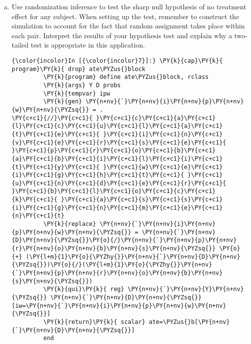 \documentclass[11pt,notitlepage]{article}\usepackage[]{graphicx}\usepackage[]{color}
\makeatletter
\newenvironment{kframe}{%
 \def\at@end@of@kframe{}%
 \ifinner\ifhmode%
  \def\at@end@of@kframe{\end{minipage}}%
  \begin{minipage}{\columnwidth}%
 \fi\fi%
 \def\FrameCommand##1{\hskip\@totalleftmargin \hskip-\fboxsep
 \colorbox{shadecolor}{##1}\hskip-\fboxsep
     \hskip-\linewidth \hskip-\@totalleftmargin \hskip\columnwidth}%
 \MakeFramed {\advance\hsize-\width
   \@totalleftmargin\z@ \linewidth\hsize
   \@setminipage}}%
 {\par\unskip\endMakeFramed%
 \at@end@of@kframe}
\newenvironment{knitrout}{}{} %
\makeatother
\begin{document}
\begin{enumerate}[a)]
\item Use randomization inference to test the sharp null hypothesis of no treatment effect for any subject.  When setting up the test, remember to construct the simulation to account for the fact that random assignment takes place within each pair.  Interpret the results of your hypothesis test and explain why a two-tailed test is appropriate in this application.
\begin{knitrout}
\color{fgcolor}\begin{kframe}
    \begin{Verbatim}[commandchars=\\\{\}]
{\color{incolor}In [{\color{incolor}7}]:} \PY{k}{cap}\PY{k}{ program}\PY{k}{ drop} ate\PYZus{}block	
         \PY{k}{program} define ate\PYZus{}block, rclass
         \PY{k}{args} Y D probs
         \PY{k}{tempvar} ipw
         \PY{k}{gen} \PY{n+nv}{`}\PY{n+nv}{i}\PY{n+nv}{p}\PY{n+nv}{w}\PY{n+nv}{\PYZsq{}} = .
\PY{c+c1}{//}\PY{c+c1}{ }\PY{c+c1}{c}\PY{c+c1}{a}\PY{c+c1}{l}\PY{c+c1}{c}\PY{c+c1}{u}\PY{c+c1}{l}\PY{c+c1}{a}\PY{c+c1}{t}\PY{c+c1}{e}\PY{c+c1}{ }\PY{c+c1}{i}\PY{c+c1}{n}\PY{c+c1}{v}\PY{c+c1}{e}\PY{c+c1}{r}\PY{c+c1}{s}\PY{c+c1}{e}\PY{c+c1}{ }\PY{c+c1}{p}\PY{c+c1}{r}\PY{c+c1}{o}\PY{c+c1}{b}\PY{c+c1}{a}\PY{c+c1}{b}\PY{c+c1}{i}\PY{c+c1}{l}\PY{c+c1}{i}\PY{c+c1}{t}\PY{c+c1}{y}\PY{c+c1}{ }\PY{c+c1}{w}\PY{c+c1}{e}\PY{c+c1}{i}\PY{c+c1}{g}\PY{c+c1}{h}\PY{c+c1}{t}\PY{c+c1}{ }\PY{c+c1}{u}\PY{c+c1}{n}\PY{c+c1}{d}\PY{c+c1}{e}\PY{c+c1}{r}\PY{c+c1}{ }\PY{c+c1}{b}\PY{c+c1}{l}\PY{c+c1}{o}\PY{c+c1}{c}\PY{c+c1}{k}\PY{c+c1}{ }\PY{c+c1}{a}\PY{c+c1}{s}\PY{c+c1}{s}\PY{c+c1}{i}\PY{c+c1}{g}\PY{c+c1}{n}\PY{c+c1}{m}\PY{c+c1}{e}\PY{c+c1}{n}\PY{c+c1}{t}
         \PY{k}{replace} \PY{n+nv}{`}\PY{n+nv}{i}\PY{n+nv}{p}\PY{n+nv}{w}\PY{n+nv}{\PYZsq{}} = \PY{n+nv}{`}\PY{n+nv}{D}\PY{n+nv}{\PYZsq{}}\PY{o}{/}\PY{n+nv}{`}\PY{n+nv}{p}\PY{n+nv}{r}\PY{n+nv}{o}\PY{n+nv}{b}\PY{n+nv}{s}\PY{n+nv}{\PYZsq{}} \PY{o}{+} (\PY{l+m}{1}\PY{o}{\PYZhy{}}\PY{n+nv}{`}\PY{n+nv}{D}\PY{n+nv}{\PYZsq{}})\PY{o}{/}(\PY{l+m}{1}\PY{o}{\PYZhy{}}\PY{n+nv}{`}\PY{n+nv}{p}\PY{n+nv}{r}\PY{n+nv}{o}\PY{n+nv}{b}\PY{n+nv}{s}\PY{n+nv}{\PYZsq{}})
         \PY{k}{qui}\PY{k}{ reg} \PY{n+nv}{`}\PY{n+nv}{Y}\PY{n+nv}{\PYZsq{}} \PY{n+nv}{`}\PY{n+nv}{D}\PY{n+nv}{\PYZsq{}} [iw=\PY{n+nv}{`}\PY{n+nv}{i}\PY{n+nv}{p}\PY{n+nv}{w}\PY{n+nv}{\PYZsq{}}]
         \PY{k}{return}\PY{k}{ scalar} ate=\PYZus{}b[\PY{n+nv}{`}\PY{n+nv}{D}\PY{n+nv}{\PYZsq{}}]
         end
\end{Verbatim}


\end{kframe}
\end{knitrout}
\end{enumerate}
\end{document}
